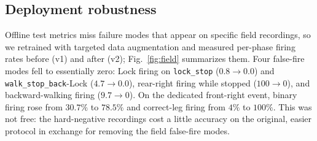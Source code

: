 \documentclass[conference]{IEEEtran}
\begin{document}
\subsection{Deployment robustness}
Offline test metrics miss failure modes that appear on specific field recordings, so we retrained with targeted data augmentation and measured per-phase firing rates before (v1) and after (v2); Fig.~\ref{fig:field} summarizes them. Four false-fire modes fell to essentially zero: Lock firing on \texttt{lock\_stop} ($0.8 \to 0.0$) and \texttt{walk\_stop\_back}-Lock ($4.7 \to 0.0$), rear-right firing while stopped ($100 \to 0$), and backward-walking firing ($9.7 \to 0$). On the dedicated front-right event, binary firing rose from $30.7\%$ to $78.5\%$ and correct-leg firing from $4\%$ to $100\%$. This was not free: the hard-negative recordings cost a little accuracy on the original, easier protocol in exchange for removing the field false-fire modes.
\end{document}
